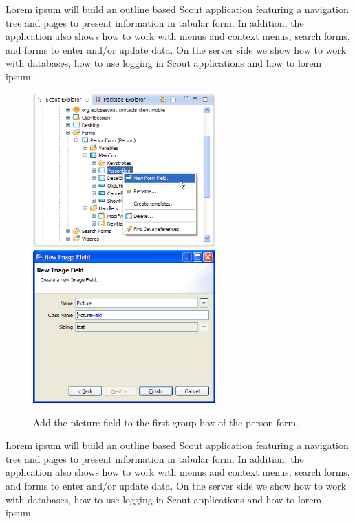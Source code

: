 \documentclass[a4paper,10pt,twoside]{book}
\begin{document}
Lorem ipsum will build an outline based Scout application featuring a navigation tree and pages to present information in tabular form. 
In addition, the application also shows how to work with menus and context menus, search forms, and forms to enter and/or update data. 
On the server side we show how to work with databases, how to use logging in Scout applications and how to lorem ipsum. 

\begin{figure}
\includegraphics[width=7cm]{new_field_picture_contextmenu.png} \hspace{5mm}
\includegraphics[width=7cm]{new_field_picture.png}
\caption{Add the picture field to the first group box of the person form.}
\end{figure}

Lorem ipsum will build an outline based Scout application featuring a navigation tree and pages to present information in tabular form. 
In addition, the application also shows how to work with menus and context menus, search forms, and forms to enter and/or update data. 
On the server side we show how to work with databases, how to use logging in Scout applications and how to lorem ipsum. 
\end{document}

